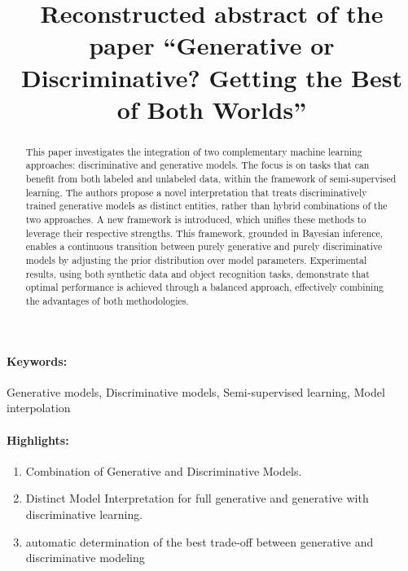 \documentclass[12pt]{article}
\title{Reconstructed abstract of the paper ``Generative or Discriminative? Getting the Best of Both Worlds''}
\date{}
\begin{document}
\maketitle
\begin{abstract}
    This paper investigates the integration of two complementary machine learning approaches: discriminative and generative models. The focus is on tasks that can benefit from both labeled and unlabeled data, within the framework of semi-supervised learning. The authors propose a novel interpretation that treats discriminatively trained generative models as distinct entities, rather than hybrid combinations of the two approaches. A new framework is introduced, which unifies these methods to leverage their respective strengths. This framework, grounded in Bayesian inference, enables a continuous transition between purely generative and purely discriminative models by adjusting the prior distribution over model parameters. Experimental results, using both synthetic data and object recognition tasks, demonstrate that optimal performance is achieved through a balanced approach, effectively combining the advantages of both methodologies.
\end{abstract}
\paragraph{Keywords:} Generative models, Discriminative models, Semi-supervised learning, Model interpolation

\paragraph{Highlights:}
\begin{enumerate}
\item Combination of Generative and Discriminative Models.
\item Distinct Model Interpretation for full generative and generative with discriminative learning.
\item automatic determination of the best trade-off between generative and discriminative modeling
\end{enumerate}



\end{document}
